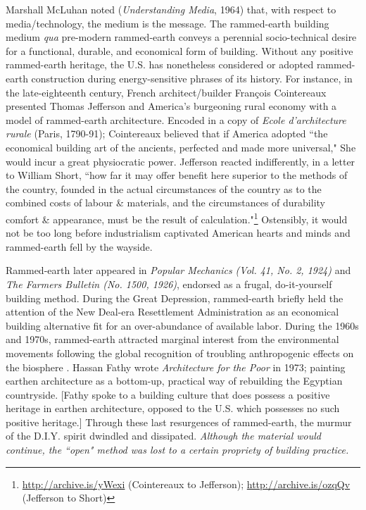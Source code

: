 Marshall McLuhan noted (\textit{Understanding Media}, 1964) that, with respect to media/technology, the medium is the message. The rammed-earth building medium \textit{qua} pre-modern rammed-earth conveys a perennial socio-technical desire for a functional, durable, and economical form of building. Without any positive rammed-earth heritage, the U.S. has nonetheless considered or adopted rammed-earth construction during energy-sensitive phrases of its history. For instance, in the late-eighteenth century, French architect/builder Fran\c cois Cointereaux presented Thomas Jefferson and America's burgeoning rural economy with a model of rammed-earth architecture. Encoded in a copy of \textit{Ecole d'architecture rurale} (Paris, 1790-91); Cointereaux believed that if America adopted ``the economical building art of the ancients, perfected and made more universal," She would incur a great physiocratic power. Jefferson reacted indifferently, in a letter to William Short, ``how far it may offer benefit here superior to the methods of the country, founded in the actual circumstances of the country as to the combined costs of labour \& materials, and the circumstances of durability comfort \& appearance, must be the result of calculation."\footnote{\url{http://archive.is/yWexi} (Cointereaux to Jefferson); \url{http://archive.is/ozqQv} (Jefferson to Short)} Ostensibly, it would not be too long before industrialism captivated American hearts and minds and rammed-earth fell by the wayside.

Rammed-earth later appeared in \textit{Popular Mechanics (Vol. 41, No. 2, 1924)} and \textit{The Farmers Bulletin  (No. 1500, 1926)}, endorsed as a frugal, do-it-yourself building method. During the Great Depression, rammed-earth briefly held the attention of the New Deal-era Resettlement Administration as an economical building alternative fit for an over-abundance of available labor. During the 1960s and 1970s, rammed-earth attracted marginal interest from the environmental movements following the global recognition of troubling anthropogenic effects on the biosphere \cite{GARDENDALE}. Hassan Fathy wrote \textit{Architecture for the Poor} in 1973; painting earthen architecture as a bottom-up, practical way of rebuilding the Egyptian countryside. [Fathy spoke to a building culture that does possess a positive heritage in earthen architecture, opposed to the U.S. which possesses no such positive heritage.] Through these last resurgences of rammed-earth, the murmur of the D.I.Y. spirit dwindled and dissipated. \textit{Although the material would continue, the ``open" method was lost to a certain propriety of building practice.}

